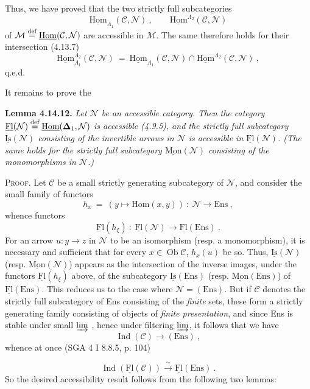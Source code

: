 \documentclass[11pt]{article}
\newcommand{\printedpage}[1]{\marginpar{\footnotesize p.~#1}}
\newcommand{\msp}[1]{\marginpar{\footnotesize [#1]}}
\newcommand{\uHom}{\underline{\mathrm{Hom}}}
\newcommand{\uFl}{\underline{\mathrm{Fl}}}
\newcommand{\uIs}{\underline{\mathrm{Is}}}
\newcommand{\uMon}{\underline{\mathrm{Mon}}}
\newcommand{\defeq}{\overset{\textup{def}}{=}}
\newcommand{\Ob}{\operatorname{Ob}}
\newcommand{\Ind}{\operatorname{Ind}}
\newcommand{\Ens}{\mathrm{Ens}}
\begin{document}
\msp{page 384}
Thus, we have proved that the two strictly full subcategories
\[
\uHom_{\Lambda_1}(\mathcal{C},\mathcal{N}) \ , \qquad \uHom^{\Lambda_2}(\mathcal{C},\mathcal{N})
\]
of $\mathcal{M} \defeq \uHom(\mathcal{C},\mathcal{N})$ are accessible in $\mathcal{M}$. The same therefore holds for their intersection (4.13.7)
\[
\uHom^{\Lambda_2}_{\Lambda_1}(\mathcal{C},\mathcal{N}) \ = \ \uHom_{\Lambda_1}(\mathcal{C},\mathcal{N}) \cap \uHom^{\Lambda_2}(\mathcal{C},\mathcal{N}) \ ,
\]
q.e.d.

It remains to prove the

\textbf{Lemma 4.14.12.} \textit{Let $\mathcal{N}$ be an accessible category. Then the category $\uFl(\mathcal{N}) \defeq \uHom(\boldsymbol{\Delta}_1,\mathcal{N})$ is accessible (4.9.5), and the strictly full subcategory $\uIs(\mathcal{N})$ consisting of the invertible arrows in $\mathcal{N}$ is accessible in $\uFl(\mathcal{N})$. (The same holds for the strictly full subcategory $\uMon(\mathcal{N})$ consisting of the monomorphisms in $\mathcal{N}$.)}

\textsc{Proof}. Let $\mathcal{C}$ be a small strictly generating subcategory of $\mathcal{N}$, and consider the small family of functors
\[
h_x \ = \ (y \longmapsto \mathrm{Hom}(x,y)) \ : \ \mathcal{N} \longrightarrow \Ens \ ,
\]
\printedpage{146}
\msp{page 385}
whence functors
\[
\uFl(h_\xi) \ : \ \uFl(\mathcal{N}) \longrightarrow \uFl(\Ens) \ . %
\]
For an arrow $u : y \longrightarrow z$ in $\mathcal{N}$ to be an isomorphism (resp. a monomorphism), it is necessary and sufficient that for every $x \in \Ob\mathcal{C}$, $h_x(u)$ be so. Thus, $\uIs(\mathcal{N})$ (resp. $\uMon(\mathcal{N})$) appears as the intersection of the inverse images, under the functors $\uFl(h_\xi)$ above, of the subcategory $\uIs(\Ens)$ (resp. $\uMon(\Ens)$) of $\uFl(\Ens)$. This reduces us to the case where $\mathcal{N} = (\Ens)$. But if $\mathcal{C}$ denotes the strictly full subcategory of Ens consisting of the \textit{finite} sets, these form a strictly generating family consisting of objects of \textit{finite presentation}, and since Ens is stable under small $\varinjlim$ , hence under filtering $\varinjlim$, it follows that we have %
\[
\Ind(\mathcal{C}) \longrightarrow (\Ens) \ , \tag*{$(*)$}
\]
whence at once (SGA 4 I 8.8.5, p. 104)

\msp{page 386}
\[
\Ind(\uFl(\mathcal{C})) \xrightarrow{\ \sim\ } \uFl(\Ens) \ . \tag*{$(*)$}
\]
So the desired accessibility result follows from the following two lemmas:
\end{document}
